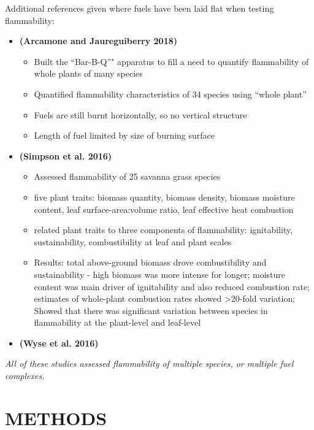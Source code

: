 \documentclass[11pt,a4paper]{article}
\begin{document}
Additional references given where fuels have been laid flat when testing
flammability:

\begin{itemize}
\item
  \textbf{(Arcamone and Jaureguiberry 2018)}

  \begin{itemize}
  \item
    Built the ``Bar-B-Q''" apparatus to fill a need to quantify
    flammability of whole plants of many species
  \item
    Quantified flammability characteristics of 34 species using ``whole
    plant''
  \item
    Fuels are still burnt horizontally, so no vertical structure
  \item
    Length of fuel limited by size of burning surface
  \end{itemize}
\item
  \textbf{(Simpson et al. 2016)}

  \begin{itemize}
  \item
    Assessed flammability of 25 savanna grass species
  \item
    five plant traits: biomass quantity, biomass density, biomass
    moisture content, leaf surface-area:volume ratio, leaf effective
    heat combustion
  \item
    related plant traits to three components of flammability:
    ignitability, sustainability, combustibility at leaf and plant
    scales
  \item
    Results: total above-ground biomass drove combustibility and
    sustainability - high biomass was more intense for longer; moisture
    content was main driver of ignitability and also reduced combustion
    rate; estimates of whole-plant combustion rates showed
    \textgreater{}20-fold variation; Showed that there was significant
    variation between species in flammability at the plant-level and
    leaf-level
  \end{itemize}
\item
  \textbf{(Wyse et al. 2016)}
\end{itemize}

\emph{All of these studies assessed flammability of multiple species, or
multiple fuel complexes.}

\hypertarget{methods}{%
\section{METHODS}\label{methods}}
\end{document}
